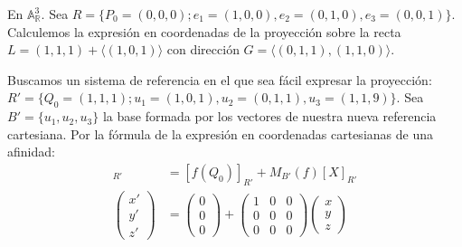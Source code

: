 \documentclass[14pt]{book}
\begin{document}
\begin{ej}
	En $\mathbb{A}_\mathbb{R}^3$. Sea $R = \{P_0 = (0,0,0); e_1 = (1,0,0), e_2 = (0,1,0), e_3 = (0,0,1)\}$. Calculemos la expresión en coordenadas de la proyección sobre la recta $L = (1,1,1) + \langle (1,0,1) \rangle$ con dirección $G = \langle (0,1,1), (1,1,0) \rangle$.
	
	Buscamos un sistema de referencia en el que sea fácil expresar la proyección: $R' = \{Q_0 = (1,1,1); u_1 = (1,0,1), u_2 = (0,1,1), u_3 = (1,1,9)\}$. Sea $B' = \{u_1, u_2, u_3\}$ la base formada por los vectores de nuestra nueva referencia cartesiana. Por la fórmula de la expresión en coordenadas cartesianas de una afinidad:
	\begin{align*}
		[X]_{R'} &= [f(Q_0)]_{R'} + M_{B'}(f) [X]_{R'} \\
		\left(\begin{array}{c}
		x' \\ y' \\ z'
		\end{array}\right) &=
		\left(\begin{array}{c}
		0 \\ 0 \\ 0
		\end{array}\right) + 
		\left(\begin{array}{ccc}
		1 & 0 & 0 \\ 0 & 0 & 0 \\ 0 & 0 & 0
		\end{array}\right)
		\left(\begin{array}{c}
		x \\ y \\ z
		\end{array}\right)
	\end{align*}
	

\end{ej}
\end{document}
